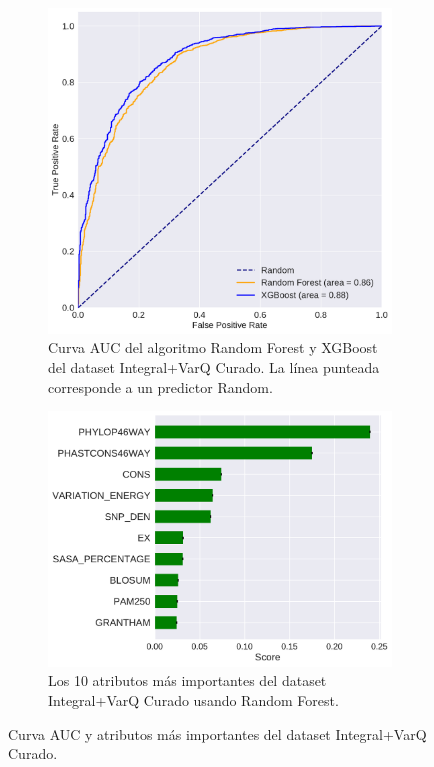 \newpage
\begin{figure}[H]
\centering
\begin{subfigure}[b]{0.7\textwidth}
    \centering
    \includegraphics[width=\textwidth]{documents/latex/figures/3/integral_varq/auc_varq_integral.pdf}
    \caption{Curva AUC del algoritmo Random Forest y XGBoost del dataset Integral+VarQ Curado. La línea punteada corresponde a un predictor Random.}
    \label{fig:auc_integral_varq}
\end{subfigure}
\hfill
\hfill
\begin{subfigure}[b]{0.7\textwidth}
    \centering
    \includegraphics[width=\textwidth]{documents/latex/figures/3/integral_varq/importances_varq_integral.pdf}
    \caption{Los 10 atributos más importantes del dataset Integral+VarQ Curado usando Random Forest.}
    \label{fig:importances_integral_varq}
\end{subfigure}

\caption{Curva AUC y atributos más importantes del dataset Integral+VarQ Curado.}
\end{figure}
